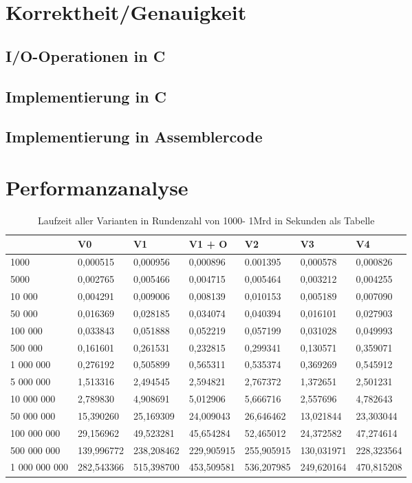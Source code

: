 \documentclass[course=asp]{aspdoc}
\begin{document}
\section{Korrektheit/Genauigkeit}
\subsection*{I/O-Operationen in C}
\subsection*{Implementierung in C}
\subsection*{Implementierung in Assemblercode}
\newpage

\section{Performanzanalyse}
\begin{table}[H]
\centering 
    \begin{tabular}{|l|l|l|l|l|l|l|}
     \hline 	       & V0 & V1 & V1 + O & V2 & V3 & V4  \\
     \hline 1000 & 0,000515 & 0,000956 & 0,000896 & 0.001395 & 0,000578  & 0,000826  \\
	 \hline 5000 & 0,002765 & 0,005466 & 0,004715 & 0,005464 & 0,003212  & 0,004255  \\
	 \hline 10 000 & 0,004291 & 0,009006 & 0,008139 & 0,010153 & 0,005189  &  0,007090 \\
	 \hline 50 000 & 0,016369 & 0,028185 & 0,034074 & 0,040394 & 0,016101  & 0,027903 \\
     \hline 100 000 & 0,033843 & 0,051888 & 0,052219 & 0,057199 & 0,031028  & 0,049993 \\
	 \hline 500 000 & 0,161601 & 0,261531 & 0,232815 & 0,299341 & 0,130571 & 0,359071\\
	 \hline 1 000 000 & 0,276192 & 0,505899 & 0,565311 & 0,535374 & 0,369269  & 0,545912 \\
	 \hline 5 000 000 & 1,513316 & 2,494545 & 2,594821 & 2,767372 & 1,372651  & 2,501231\\
     \hline 10 000 000 & 2,789830 & 4,908691 & 5,012906 & 5,666716 & 2,557696  & 4,782643 \\
	 \hline 50 000 000 & 15,390260 & 25,169309 & 24,009043 & 26,646462 & 13,021844  & 23,303044  \\
	 \hline 100 000 000 & 29,156962 & 49,523281 & 45,654284 & 52,465012 & 24,372582 & 47,274614 \\
	 \hline 500 000 000 & 139,996772 & 238,208462 & 229,905915 & 255,905915 & 130,031971 & 228,323564  \\
     \hline 1 000 000 000 & 282,543366 & 515,398700 & 453,509581 & 536,207985 & 249,620164  & 470,815208 \\
	\hline
    \end{tabular}
    \caption{Laufzeit aller Varianten in Rundenzahl von 1000- 1Mrd in Sekunden als Tabelle}
\end{table}
\end{document}

